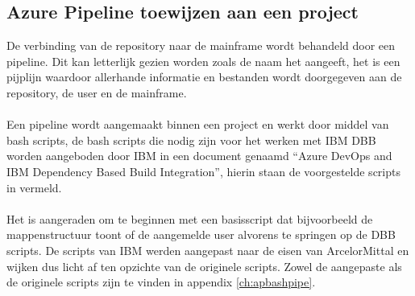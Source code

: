 \subsection{Azure Pipeline toewijzen aan een project}
De verbinding van de repository naar de mainframe wordt behandeld door een pipeline. Dit kan letterlijk gezien worden zoals de naam het aangeeft, het is een pijplijn waardoor allerhande informatie en bestanden wordt doorgegeven aan de repository, de user en de mainframe. 
\\ \\
Een pipeline wordt aangemaakt binnen een project en werkt door middel van bash scripts, de bash scripts die nodig zijn voor het werken met IBM DBB worden aangeboden door IBM in een document genaamd \enquote{Azure DevOps and IBM Dependency Based Build Integration}, hierin staan de voorgestelde scripts in vermeld. 
\\ \\
Het is aangeraden om te beginnen met een basisscript dat bijvoorbeeld de mappenstructuur toont of de aangemelde user alvorens te springen op de DBB scripts. De scripts van IBM werden aangepast naar de eisen van ArcelorMittal en wijken dus licht af ten opzichte van de originele scripts. Zowel de aangepaste als de originele scripts zijn te vinden in appendix \ref{ch:apbashpipe}.

